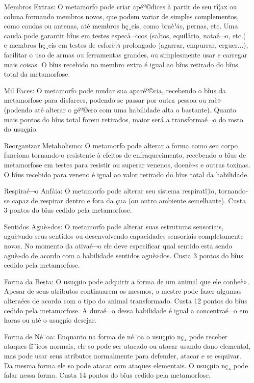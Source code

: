 	 		Membros Extras: O metamorfo pode criar apéº©dices à partir de seu tî¦ax ou coluna formando membros novos, que podem variar de simples complementos, como caudas ou antenas, até membros hç¸eis, como braè¼s, pernas, etc. Uma cauda pode garantir bîus em testes especå¬icos (saltos, equilårio, nataé¬o, etc.) e membros hç¸eis em testes de esforè¼ prolongado (agarrar, empurrar, erguer...), facilitar o uso de armas ou ferramentas grandes, ou simplesmente usar e carregar mais coisas. O bîus recebido no membro extra é igual ao bîus retirado do bîus total da metamorfose.

	 		Mil Faces: O metamorfo pode mudar sua aparéº©cia, recebendo o bîus da metamorfose para disfarces, podendo se passar por outra pessoa ou raè» (podendo até alterar o géº©ero com uma habilidade alta o bastante). Quanto mais pontos do bîus total forem retirados, maior será a transformaé¬o do rosto do usuçµio.

	 		Reorganizar Metabolismo: O metamorfo pode alterar a forma como seu corpo funciona tornando-o resistente à efeitos de enfraquecimento, recebendo o bîus de metamorfose em testes para resistir ou superar venenos, doenè»s e outras toxinas. O bîus recebido para veneno é igual ao valor retirado do bîus total da habilidade.

	 		Respiraé¬o Anfåia: O metamorfo pode alterar seu sistema respiratî¦io, tornando-se capaz de respirar dentro e fora da çua (ou outro ambiente semelhante). Custa 3 pontos do bîus cedido pela metamorfose.

	 		Sentidos Aguè»dos: O metamorfo pode alterar suas estruturas sensoriais, aguè»ndo seus sentidos ou desenvolvendo capacidades sensoriais completamente novas. No momento da ativaé¬o ele deve especificar qual sentido esta sendo aguè»do de acordo com a habilidade sentidos aguè»dos. Custa 3 pontos do bîus cedido pela metamorfose.
	
	 		Forma da Besta: O usuçµio pode adquirir a forma de um animal que ele conheè». Apesar de seus atributos continuarem os mesmos, o mestre pode fazer algumas alteraées de acordo com o tipo do animal transformado. Custa 12 pontos do bîus cedido pela metamorfose. A duraé¬o dessa habilidade é igual a concentraé¬o em horas ou até o usuçµio desejar.
	
	 		Forma de Né¨oa: Enquanto na forma de né¨oa o usuçµio nç¸ pode receber ataques fï¨icos normais, ele so pode ser atacado ou atacar usando dano elemental, mas pode usar seus atributos normalmente para defender, atacar e se esquivar. Da mesma forma ele so pode atacar com ataques elementais. O usuçµio nç¸ pode falar nessa forma. Custa 14 pontos do bîus cedido pela metamorfose.



